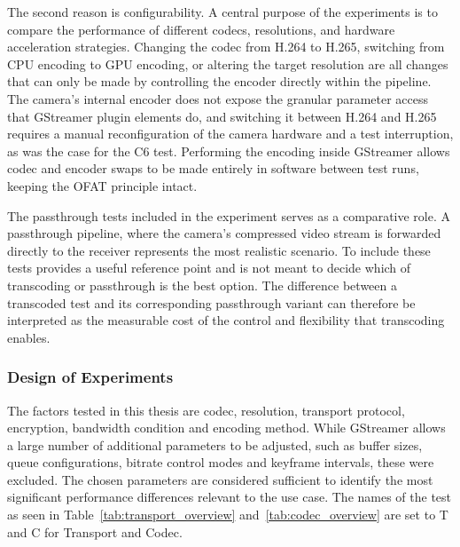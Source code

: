 The second reason is configurability. A central purpose of the experiments is to compare the performance of different codecs, resolutions, and hardware acceleration strategies. Changing the codec from H.264 to H.265, switching from CPU encoding to GPU encoding, or altering the target resolution are all changes that can only be made by controlling the encoder directly within the pipeline. The camera's internal encoder does not expose the granular parameter access that GStreamer plugin elements do, and switching it between H.264 and H.265 requires a manual reconfiguration of the camera hardware and a test interruption, as was the case for the C6 test. Performing the encoding inside GStreamer allows codec and encoder swaps to be made entirely in software between test runs, keeping the OFAT principle intact.

The passthrough tests included in the experiment serves as a comparative role. A passthrough pipeline, where the camera's compressed video stream is forwarded directly to the receiver represents the most realistic scenario. To include these tests provides a useful reference point and is not meant to decide which of transcoding or passthrough is the best option. The difference between a transcoded test and its corresponding passthrough variant can therefore be interpreted as the measurable cost of the control and flexibility that transcoding enables.

\subsubsection{Design of Experiments}

The factors tested in this thesis are codec, resolution, transport protocol, encryption, bandwidth condition and encoding method. While GStreamer allows a large number of additional parameters to be adjusted, such as buffer sizes, queue configurations, bitrate control modes and keyframe intervals, these were excluded. The chosen parameters are considered sufficient to identify the most significant performance differences relevant to the use case. The names of the test as seen in Table~\ref{tab:transport_overview} and~\ref{tab:codec_overview} are set to T and C for Transport and Codec.



